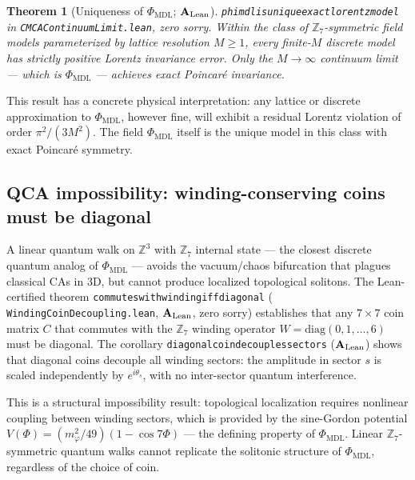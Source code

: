 \documentclass[11pt]{article}
\newtheorem{theorem}{Theorem}[section]
\theoremstyle{remark}
\newcommand{\PHIMDL}{\Phi_{\mathrm{MDL}}}
\newcommand{\ZS}{\mathbb{Z}_7}
\newcommand{\lean}[1]{%
  \penalty-100
  \begingroup\def\_{\textunderscore\allowbreak}\texttt{#1}\endgroup}
\newcommand{\CatAL}{\ensuremath{\textbf{A}_{\rm Lean}}}
\begin{document}
\begin{theorem}[Uniqueness of $\PHIMDL$; $\CatAL$]
  \label{thm:unique_model}
  \lean{phimdl\_is\_unique\_exact\_lorentz\_model} in
  \lean{CMCAContinuumLimit.lean}, zero sorry.  Within the class of $\ZS$-symmetric
  field models parameterized by lattice resolution $M\geq1$, every finite-$M$
  discrete model has strictly positive Lorentz invariance error.  Only the
  $M\to\infty$ continuum limit --- which is $\PHIMDL$ --- achieves exact
  Poincar\'e invariance.
\end{theorem}

This result has a concrete physical interpretation: any lattice or discrete
approximation to $\PHIMDL$, however fine, will exhibit a residual Lorentz
violation of order $\pi^2/(3M^2)$.  The field $\PHIMDL$ itself is the unique
model in this class with exact Poincar\'e symmetry.

\subsection{QCA impossibility: winding-conserving coins must be diagonal}
\label{ssec:qca_impossibility}

A linear quantum walk on $\mathbb{Z}^3$ with $\ZS$ internal state --- the closest
discrete quantum analog of $\PHIMDL$ --- avoids the vacuum/chaos bifurcation that
plagues classical CAs in 3D, but cannot produce localized topological solitons.
The Lean-certified theorem \lean{commutes\_with\_winding\_iff\_diagonal}
(\lean{WindingCoinDecoupling.lean}, $\CatAL$, zero sorry) establishes that any
$7\times7$ coin matrix $C$ that commutes with the $\ZS$ winding operator
$W = \mathrm{diag}(0,1,\ldots,6)$ must be diagonal.  The corollary
\lean{diagonal\_coin\_decouples\_sectors} ($\CatAL$) shows that diagonal coins
decouple all winding sectors: the amplitude in sector $s$ is scaled independently
by $e^{i\theta_s}$, with no inter-sector quantum interference.

This is a structural impossibility result: topological localization requires
nonlinear coupling between winding sectors, which is provided by the sine-Gordon
potential $V(\Phi) = (m_\varphi^2/49)(1-\cos 7\Phi)$ --- the defining property of
$\PHIMDL$.  Linear $\ZS$-symmetric quantum walks cannot replicate the solitonic
structure of $\PHIMDL$, regardless of the choice of coin.

\end{document}
